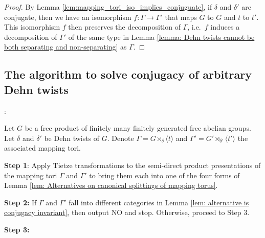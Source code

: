 \documentclass{amsart}
\newcommand{\vs}{\vspace{10pt}}
\theoremstyle{plain}
\theoremstyle{definition}
\theoremstyle{remark}
\begin{document}
\begin{proof}
    By Lemma \ref{lem:mapping_tori_iso_implies_conjuguate}, if $\delta$ and $\delta'$ are conjugate, then we have an isomorphism $f : \Gamma \to \Gamma'$ that maps $G$ to $G$ and $t$ to $t'$. This isomorphism $f$ then preserves the decomposition of $\Gamma$, i.e.\ $f$ induces a decomposition of $\Gamma'$ of the same type in Lemma \ref{lemma: Dehn twists cannot be both separating and non-separating} as $\Gamma$. 
    
\end{proof}

\subsection{The algorithm to solve conjugacy of arbitrary Dehn twists}: 

Let $G$ be a free product of finitely many finitely generated free abelian groups. Let $\delta$ and $\delta'$ be Dehn twists of $G$. Denote $\Gamma = G \rtimes_{\delta} \langle t \rangle$ and $\Gamma' = G' \rtimes_{\delta'} \langle t' \rangle$ the associated mapping tori.

\vs 

\textbf{Step 1}: Apply Tietze transformations to the semi-direct product presentations of the mapping tori $\Gamma$ and $\Gamma'$ to bring them each into one of the four forms of Lemma \ref{lem: Alternatives on canonical splittings of mapping torus}. 

\textbf{Step 2:} If $\Gamma$ and $\Gamma'$ fall into different categories in Lemma \ref{lem: alternative is conjugacy invariant}, then output NO and stop. Otherwise, proceed to Step 3.

\textbf{Step 3:} 
\end{document}
